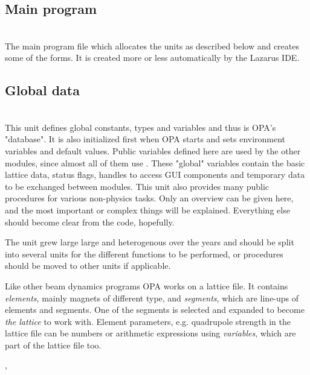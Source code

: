 \documentclass[12pt]{article}
\newcommand\code[1]{{\tt #1}}
\newcommand{\opauni}[1]{\colorbox{orange!30}{{\color{black}\code{#1}}}}
\newcommand{\ounih}[2]{\subsection{\label{#2}#1}{\Huge\opauni{#2}}\\}
\newcommand{\ouni}[1]{\hyperref[#1]{\opauni{#1}}}
\newcommand{\uses}[1]{\flushleft {\bf Uses:} #1}
\newcommand{\desc}[1]{#1}
\newcommand{\todo}[1]{{\color{red} #1}}
\begin{document}
\ounih{Main program}{{opa.lpr}}

\desc{The main program file which allocates the units as described below and creates some of the forms. It is created more or less automatically by the Lazarus IDE.}


\ounih{Global data}{globlib}

\desc{
This unit defines global constants, types and variables and thus is OPA's "database". It is also initialized first when OPA starts and sets environment variables and default values. Public variables defined here are used by the other modules, since almost all of them use \ouni{globlib}. These "global" variables contain the basic lattice data, status flags, handles to access GUI components and temporary data to be exchanged between modules. This unit also provides many public procedures for various non-physics tasks. Only an overview can be given here, and the most important or complex things will be explained. Everything else should become clear from the code, hopefully.

\todo{The \ouni{globlib} unit grew large large and heterogenous over the years and should be split into several units for the different functions to be performed, or procedures should be moved to other units if applicable.}

Like other beam dynamics programs OPA works on a lattice file. It contains {\em elements}, mainly magnets of different type, and {\em segments}, which are line-ups of elements and segments. One of the segments is selected and expanded to become {\em the lattice} to work with. Element parameters, e.g. quadrupole strength in the lattice file can be numbers or arithmetic expressions using {\em variables}, which are part of the lattice file too.
}

\uses{\opauni{../com/mathlib}, \opauni{../com/asaux}}
\end{document}
